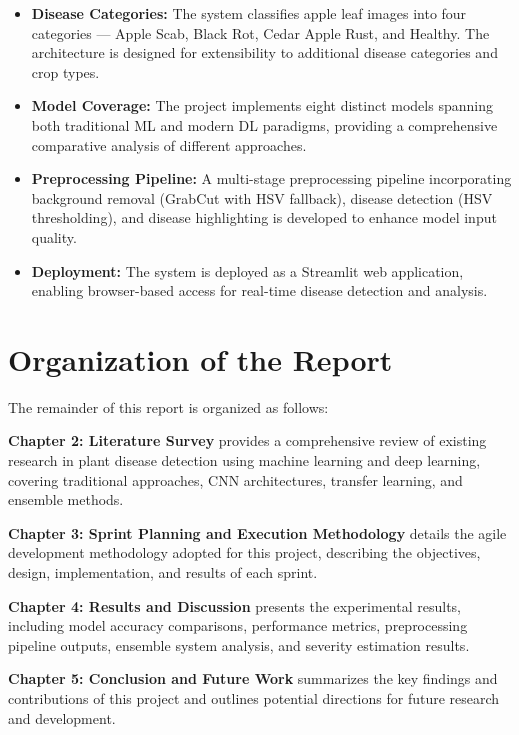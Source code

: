 \documentclass[12pt]{report}
\begin{document}
\begin{itemize}[leftmargin=*]
\item \textbf{Disease Categories:} The system classifies apple leaf images into four categories --- Apple Scab, Black Rot, Cedar Apple Rust, and Healthy. The architecture is designed for extensibility to additional disease categories and crop types.

\item \textbf{Model Coverage:} The project implements eight distinct models spanning both traditional ML and modern DL paradigms, providing a comprehensive comparative analysis of different approaches.

\item \textbf{Preprocessing Pipeline:} A multi-stage preprocessing pipeline incorporating background removal (GrabCut with HSV fallback), disease detection (HSV thresholding), and disease highlighting is developed to enhance model input quality.

\item \textbf{Deployment:} The system is deployed as a Streamlit web application, enabling browser-based access for real-time disease detection and analysis.
\end{itemize}

\section{Organization of the Report}

The remainder of this report is organized as follows:

\textbf{Chapter 2: Literature Survey} provides a comprehensive review of existing research in plant disease detection using machine learning and deep learning, covering traditional approaches, CNN architectures, transfer learning, and ensemble methods.

\textbf{Chapter 3: Sprint Planning and Execution Methodology} details the agile development methodology adopted for this project, describing the objectives, design, implementation, and results of each sprint.

\textbf{Chapter 4: Results and Discussion} presents the experimental results, including model accuracy comparisons, performance metrics, preprocessing pipeline outputs, ensemble system analysis, and severity estimation results.

\textbf{Chapter 5: Conclusion and Future Work} summarizes the key findings and contributions of this project and outlines potential directions for future research and development.
\end{document}

